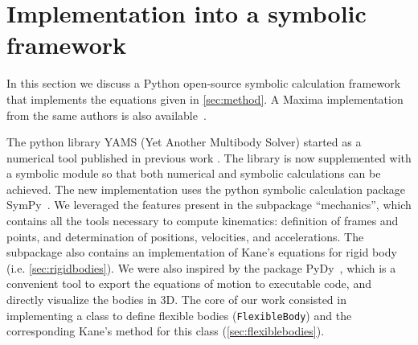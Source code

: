 \documentclass[wes, manuscript]{copernicus}
\begin{document}
\section{Implementation into a symbolic framework}
\label{sec:implementation}
In this section we discuss a Python open-source symbolic calculation framework that implements the equations given in \autoref{sec:method}. 
A Maxima implementation from the same authors is also available~\cite{CADynTurb}.

The python library YAMS (Yet Another Multibody Solver) started as a numerical tool published in previous work \citep{branlard:2019flex}.
The library is now supplemented with a symbolic module so that both numerical and symbolic calculations can be achieved.
The new implementation uses the python symbolic calculation package SymPy~\citep{sympy}.
We leveraged the features present in the subpackage ``mechanics'', which contains all the tools necessary to compute kinematics: definition of frames and points, and determination of positions, velocities, and accelerations. The subpackage also contains an implementation of Kane's equations for rigid body (i.e. \autoref{sec:rigidbodies}).
We were also inspired by the package PyDy~\citep{Gede:2013}, which is a convenient tool to export the equations of motion to executable code, and directly visualize the bodies in 3D.
The core of our work consisted in implementing a class to define flexible bodies (\texttt{FlexibleBody}) and the corresponding Kane's method for this class (\autoref{sec:flexiblebodies}).  
\end{document}
